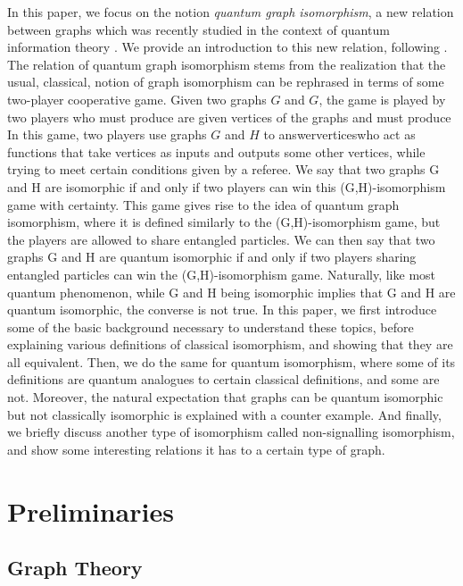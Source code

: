 \documentclass[12pt]{article}
\begin{document}
In this paper, we focus on the notion \emph{quantum graph
  isomorphism}, a new relation between graphs which was recently
studied in the context of quantum information theory \cite{amrssv2016,
  mrv2018, lmr2017, rm2012, assz2017}. We provide an
introduction to this new relation, following \cite{amrssv2016}. The
relation of quantum graph isomorphism stems from the realization that
the usual, classical, notion of graph isomorphism can be rephrased in
terms of some two-player cooperative game. Given two graphs $G$ and
$G$, the game is played by two players who must produce are given
vertices of the graphs and must produce In this game, two players use
graphs $G$ and $H$ to answerverticeswho act as functions that take
vertices as inputs and outputs some other vertices, while trying to
meet certain conditions given by a referee. We say that two graphs G
and H are isomorphic if and only if two players can win this
(G,H)-isomorphism game with certainty. This game gives rise to the
idea of quantum graph isomorphism, where it is defined similarly to
the (G,H)-isomorphism game, but the players are allowed to share
entangled particles. We can then say that two graphs G and H are
quantum isomorphic if and only if two players sharing entangled
particles can win the (G,H)-isomorphism game. Naturally, like most
quantum phenomenon, while G and H being isomorphic implies that G and
H are quantum isomorphic, the converse is not true. In this paper, we
first introduce some of the basic background necessary to understand
these topics, before explaining various definitions of classical
isomorphism, and showing that they are all equivalent. Then, we do the
same for quantum isomorphism, where some of its definitions are
quantum analogues to certain classical definitions, and some are
not. Moreover, the natural expectation that graphs can be quantum
isomorphic but not classically isomorphic is explained with a counter
example. And finally, we briefly discuss another type of isomorphism
called non-signalling isomorphism, and show some interesting relations
it has to a certain type of graph.

\section{Preliminaries}
\label{sec:prelim}

\subsection{Graph Theory}
\label{ssec:graphtheory}
\end{document}
